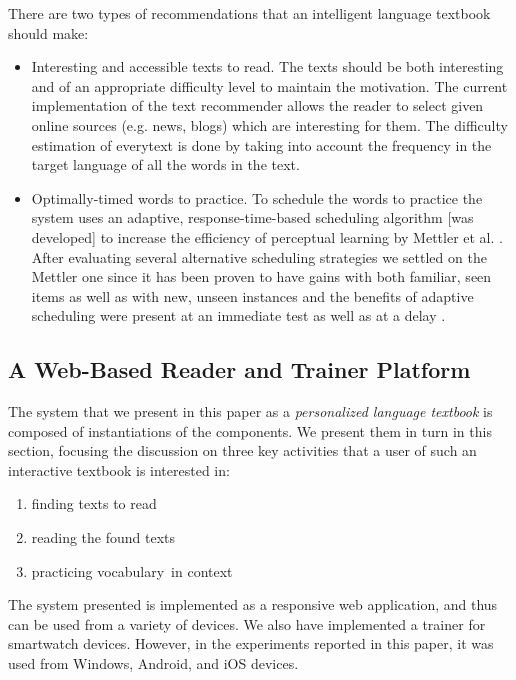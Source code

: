 There are two types of recommendations that an intelligent language textbook should make: 
\begin{itemize}
	\item Interesting and accessible texts to read. The texts should be both interesting and of an appropriate difficulty level to maintain the motivation. The current implementation of the text recommender allows the reader to select given online sources (e.g. news, blogs) which are interesting for them. The difficulty estimation of everytext is done by taking into account the frequency in the target language of all the words in the text. 
	\item Optimally-timed words to practice. To schedule the words to practice the system uses an adaptive, response-time-based scheduling algorithm [was developed] to increase the efficiency of perceptual learning by Mettler et al. \cite{Mettler14-ARTS}. After evaluating several alternative scheduling strategies we settled on the Mettler one since it has been proven to have gains with both familiar, seen items as well as with new, unseen instances and the benefits of adaptive scheduling were present at an immediate test as well as at a delay \cite{Mettler14-ARTS}.
\end{itemize}



\subsection{A Web-Based Reader and Trainer Platform}



The system that we present in this paper as a {\em personalized language textbook} is composed of instantiations of the components. We present them in turn in this section, focusing the discussion on three key activities that a user of such an interactive textbook is interested in: 

\begin{enumerate}
	\item finding texts to read
	\item reading the found texts
	\item practicing vocabulary in context
\end{enumerate}

\begin{added}
	
	The system presented is implemented as a responsive web application, and thus can be used from a variety of devices. We also have implemented a trainer for smartwatch devices. However, in the experiments reported in this paper, it was used from Windows, Android, and iOS devices. 

\end{added}




